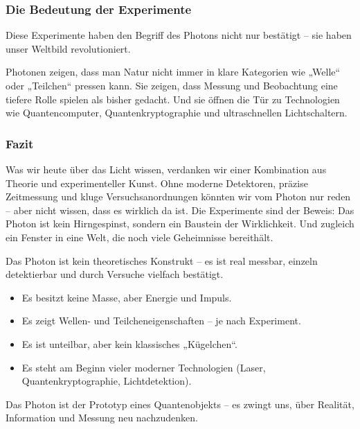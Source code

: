 \subsubsection{Die Bedeutung der Experimente}
\label{box:experimente}
\begin{tcolorbox}[didaktikbox, title=Was uns die Experimente lehren]
	Diese Experimente haben den Begriff des Photons nicht nur bestätigt – sie haben unser Weltbild revolutioniert. 
	
	Photonen zeigen, dass man Natur nicht immer in klare Kategorien wie „Welle“ oder „Teilchen“ pressen kann. Sie zeigen, dass Messung und Beobachtung eine tiefere Rolle spielen als bisher gedacht. Und sie öffnen die Tür zu Technologien wie Quantencomputer, Quantenkryptographie und ultraschnellen Lichtschaltern.
\end{tcolorbox}

\subsubsection{Fazit}

Was wir heute über das Licht wissen, verdanken wir einer Kombination aus Theorie und experimenteller Kunst. Ohne moderne Detektoren, präzise Zeitmessung und kluge Versuchsanordnungen könnten wir vom Photon nur reden – aber nicht wissen, dass es wirklich da ist. Die Experimente sind der Beweis: Das Photon ist kein Hirngespinst, sondern ein Baustein der Wirklichkeit. Und zugleich ein Fenster in eine Welt, die noch viele Geheimnisse bereithält.

\medskip
\begin{tcolorbox}[didaktikbox, title=Was wir aus Kapitel I mitnehmen]
	\label{box:kapitel1faz}
	Das Photon ist kein theoretisches Konstrukt – es ist real messbar, einzeln detektierbar und durch Versuche vielfach bestätigt.
	
	\begin{itemize}
		\item Es besitzt keine Masse, aber Energie und Impuls.
		\item Es zeigt Wellen- und Teilcheneigenschaften – je nach Experiment.
		\item Es ist unteilbar, aber kein klassisches „Kügelchen“.
		\item Es steht am Beginn vieler moderner Technologien (Laser, Quantenkryptographie, Lichtdetektion).
	\end{itemize}
	
	Das Photon ist der Prototyp eines Quantenobjekts – es zwingt uns, über Realität, Information und Messung neu nachzudenken.
\end{tcolorbox}

